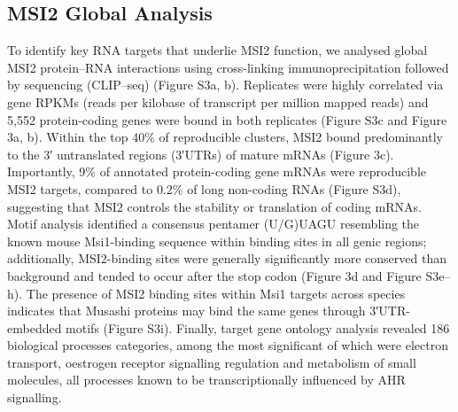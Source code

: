 \subsection{MSI2 Global Analysis}

To identify key RNA targets that underlie MSI2 function, we analysed global MSI2 protein–RNA interactions using cross-linking immunoprecipitation followed by sequencing (CLIP–seq)\cite{Yeo2009} (Figure S3a, b). Replicates were highly correlated via gene RPKMs (reads per kilobase of transcript per million mapped reads) and 5,552 protein-coding genes were bound in both replicates (Figure S3c and Figure 3a, b). Within the top 40\% of reproducible clusters, MSI2 bound predominantly to the 3′ untranslated regions (3′UTRs) of mature mRNAs (Figure 3c). Importantly, 9\% of annotated protein-coding gene mRNAs were reproducible MSI2 targets, compared to 0.2\% of long non-coding RNAs (Figure S3d), suggesting that MSI2 controls the stability or translation of coding mRNAs. Motif analysis identified a consensus pentamer (U/G)UAGU resembling the known mouse Msi1-binding sequence\cite{Ohyama2012, Katz2014} within binding sites in all genic regions; additionally, MSI2-binding sites were generally significantly more conserved than background and tended to occur after the stop codon (Figure 3d and Figure S3e–h). The presence of MSI2 binding sites within Msi1 targets\cite{Katz2014} across species indicates that Musashi proteins may bind the same genes through 3′UTR-embedded motifs (Figure S3i). Finally, target gene ontology analysis revealed 186 biological processes categories, among the most significant of which were electron transport, oestrogen receptor signalling regulation and metabolism of small molecules, all processes known to be transcriptionally influenced by AHR signalling\cite{Tijet2005}.

